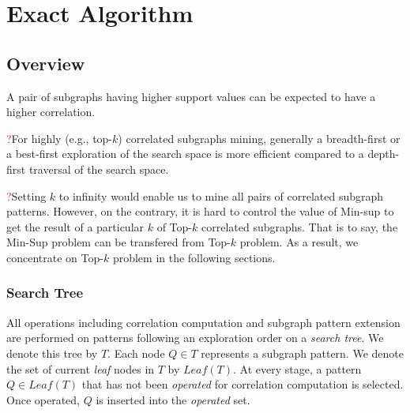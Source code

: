 \section{Exact Algorithm}
\label{sec:exact_algo}

\subsection{Overview}
\label{subsec:exact_algo_overview}

\begin{observation}
	\label{ob:frequency}
	A pair of subgraphs having higher support values can be expected to
	have a higher correlation.
\end{observation}

\begin{observation}
	\label{ob:dfs}
	\textcolor{red}{?}For highly (e.g., top-$k$) correlated subgraphs mining, generally a
	breadth-first or a best-first exploration of the search space is more
	efficient compared to a depth-first traversal of the search space.
\end{observation}

\textcolor{red}{?}Setting $k$ to infinity would enable us to mine all pairs of correlated subgraph
patterns. However, on the contrary, it is hard to control the value of {\sf
Min-sup} to get the result of a particular $k$ of {\sf Top-$k$} correlated
subgraphs. That is to say, the {\sf Min-Sup} problem can be transfered from {\sf
Top-$k$} problem. As a result, we concentrate on {\sf Top-$k$} problem in the
following sections.

\subsubsection{Search Tree}
\label{subsubsec:exact_algo_searchtree}
All operations including correlation computation and subgraph pattern extension
are performed on patterns following an exploration order on a \textit{search tree}.
We denote this tree by $T$. Each node $Q\in T$ represents a subgraph pattern. We
denote the set of current \textit{leaf} nodes in $T$ by $Leaf(T)$. At
every stage, a pattern $Q\in Leaf(T)$ that has not been \textit{operated} for correlation
computation is selected. Once operated, $Q$ is inserted into the
\textit{operated} set.


